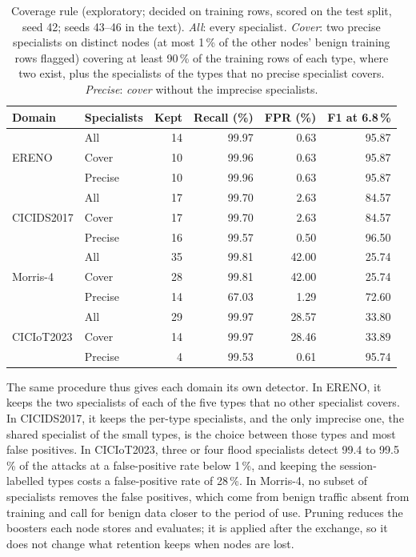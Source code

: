 \begin{table}[htbp]
\centering
\caption{Coverage rule (exploratory; decided on training rows, scored on the test split, seed 42; seeds 43--46 in the text). \emph{All}: every specialist. \emph{Cover}: two precise specialists on distinct nodes (at most 1\,\% of the other nodes' benign training rows flagged) covering at least 90\,\% of the training rows of each type, where two exist, plus the specialists of the types that no precise specialist covers. \emph{Precise}: \emph{cover} without the imprecise specialists.}
\label{tab:coverage-rule}
\small
\begin{tabular}{@{}llrrrr@{}}
\toprule
Domain & Specialists & Kept & Recall (\%) & FPR (\%) & F1 at 6.8\,\% \\
\midrule
\multirow{3}{*}{ERENO}      & All     & 14 & 99.97 &  0.63 & 95.87 \\
                            & Cover   & 10 & 99.96 &  0.63 & 95.87 \\
                            & Precise & 10 & 99.96 &  0.63 & 95.87 \\
\midrule
\multirow{3}{*}{CICIDS2017} & All     & 17 & 99.70 &  2.63 & 84.57 \\
                            & Cover   & 17 & 99.70 &  2.63 & 84.57 \\
                            & Precise & 16 & 99.57 &  0.50 & 96.50 \\
\midrule
\multirow{3}{*}{Morris-4}   & All     & 35 & 99.81 & 42.00 & 25.74 \\
                            & Cover   & 28 & 99.81 & 42.00 & 25.74 \\
                            & Precise & 14 & 67.03 &  1.29 & 72.60 \\
\midrule
\multirow{3}{*}{CICIoT2023} & All     & 29 & 99.97 & 28.57 & 33.80 \\
                            & Cover   & 14 & 99.97 & 28.46 & 33.89 \\
                            & Precise &  4 & 99.53 &  0.61 & 95.74 \\
\bottomrule
\end{tabular}
\end{table}

The same procedure thus gives each domain its own detector. In ERENO, it keeps the two specialists of each of the five types that no other specialist covers. In CICIDS2017, it keeps the per-type specialists, and the only imprecise one, the shared specialist of the small types, is the choice between those types and most false positives. In CICIoT2023, three or four flood specialists detect 99.4 to 99.5\,\% of the attacks at a false-positive rate below 1\,\%, and keeping the session-labelled types costs a false-positive rate of 28\,\%. In Morris-4, no subset of specialists removes the false positives, which come from benign traffic absent from training and call for benign data closer to the period of use. Pruning reduces the boosters each node stores and evaluates; it is applied after the exchange, so it does not change what retention keeps when nodes are lost.

